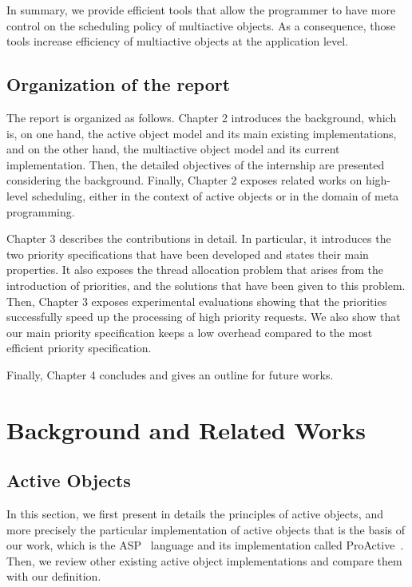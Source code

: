 \documentclass[11pt]{report}
\begin{document}
In summary, we provide efficient tools that allow the programmer to have more control on the scheduling policy of multiactive objects. As a consequence, those tools increase efficiency of multiactive objects at the application level.


\section{Organization of the report}
The report is organized as follows. Chapter 2 introduces the background, which is, on one hand, the active object model and its main existing implementations, and on the other hand, the multiactive object model and its current implementation. Then, the detailed objectives of the internship are presented considering the background. Finally, Chapter 2 exposes related works on high-level scheduling, either in the context of active objects or in the domain of meta programming.

Chapter 3 describes the contributions in detail. In particular, it introduces the two priority specifications that have been developed and states their main properties. It also exposes the thread allocation problem that arises from the introduction of priorities, and the solutions that have been given to this problem. Then, Chapter 3 exposes experimental evaluations showing that the priorities successfully speed up the processing of high priority requests. We also show that our main priority specification keeps a low overhead compared to the most efficient priority specification.

Finally, Chapter 4 concludes and gives an outline for future works.

\chapter{Background and Related Works}
\section{Active Objects}
In this section, we first present in details the principles of active objects, and more precisely the particular implementation of active objects that is the basis of our work, which is the ASP~\cite{ref:asp} language and its implementation called ProActive~\cite{ref:proactive}. Then, we review other existing active object implementations and compare them with our definition.
\end{document}
